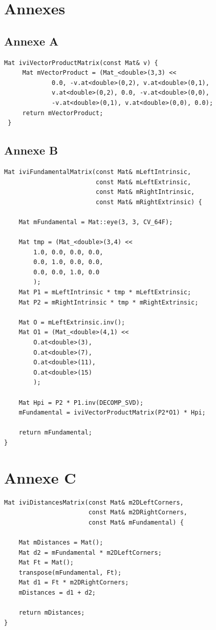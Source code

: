 \documentclass[a4paper,10pt]{article}
\begin{document}
\section{Annexes}
\subsection{Annexe A}
\label{AproduitVector}
\begin{lstlisting}[caption=Calcul produit vectoriel]
 Mat iviVectorProductMatrix(const Mat& v) {
     Mat mVectorProduct = (Mat_<double>(3,3) <<
             0.0, -v.at<double>(0,2), v.at<double>(0,1),
             v.at<double>(0,2), 0.0, -v.at<double>(0,0),
             -v.at<double>(0,1), v.at<double>(0,0), 0.0);
     return mVectorProduct;
 }
\end{lstlisting}

\subsection{Annexe B}
\label{Afondamentale}
\begin{lstlisting}[caption=Calcul matrice fondamentale]
 Mat iviFundamentalMatrix(const Mat& mLeftIntrinsic,
                         const Mat& mLeftExtrinsic,
                         const Mat& mRightIntrinsic,
                         const Mat& mRightExtrinsic) {
                         
    Mat mFundamental = Mat::eye(3, 3, CV_64F);
   
    Mat tmp = (Mat_<double>(3,4) <<
        1.0, 0.0, 0.0, 0.0,
        0.0, 1.0, 0.0, 0.0,
        0.0, 0.0, 1.0, 0.0
        );
    Mat P1 = mLeftIntrinsic * tmp * mLeftExtrinsic;
    Mat P2 = mRightIntrinsic * tmp * mRightExtrinsic;

    Mat O = mLeftExtrinsic.inv();
    Mat O1 = (Mat_<double>(4,1) <<
        O.at<double>(3),
        O.at<double>(7),
        O.at<double>(11),
        O.at<double>(15)
        );

    Mat Hpi = P2 * P1.inv(DECOMP_SVD);
    mFundamental = iviVectorProductMatrix(P2*O1) * Hpi;

    return mFundamental;
}
\end{lstlisting}

\section{Annexe C}
\label{distanceA}
\begin{lstlisting}[caption=Calcul des distances entre les points de chaque paire]
 Mat iviDistancesMatrix(const Mat& m2DLeftCorners,
                       const Mat& m2DRightCorners,
                       const Mat& mFundamental) {
 
    Mat mDistances = Mat();
    Mat d2 = mFundamental * m2DLeftCorners;
    Mat Ft = Mat();
    transpose(mFundamental, Ft);
    Mat d1 = Ft * m2DRightCorners;
    mDistances = d1 + d2;
    
    return mDistances;
}
\end{lstlisting}



 
\end{document}
